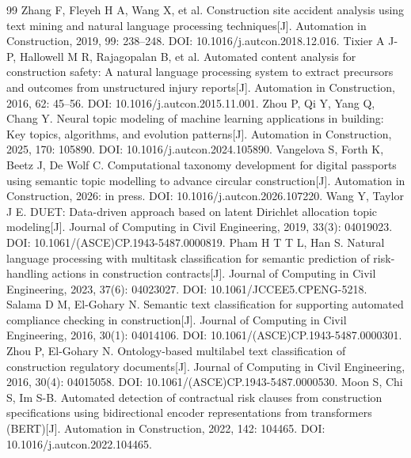 \documentclass[11pt]{article}
\begin{document}
\begin{thebibliography}{99}
 Zhang F, Fleyeh H A, Wang X, et al. Construction site accident analysis using text mining and natural language processing techniques[J]. Automation in Construction, 2019, 99: 238--248. DOI: 10.1016/j.autcon.2018.12.016.
 Tixier A J-P, Hallowell M R, Rajagopalan B, et al. Automated content analysis for construction safety: A natural language processing system to extract precursors and outcomes from unstructured injury reports[J]. Automation in Construction, 2016, 62: 45--56. DOI: 10.1016/j.autcon.2015.11.001.
 Zhou P, Qi Y, Yang Q, Chang Y. Neural topic modeling of machine learning applications in building: Key topics, algorithms, and evolution patterns[J]. Automation in Construction, 2025, 170: 105890. DOI: 10.1016/j.autcon.2024.105890.
 Vangelova S, Forth K, Beetz J, De Wolf C. Computational taxonomy development for digital passports using semantic topic modelling to advance circular construction[J]. Automation in Construction, 2026: in press. DOI: 10.1016/j.autcon.2026.107220.
 Wang Y, Taylor J E. DUET: Data-driven approach based on latent Dirichlet allocation topic modeling[J]. Journal of Computing in Civil Engineering, 2019, 33(3): 04019023. DOI: 10.1061/(ASCE)CP.1943-5487.0000819.
 Pham H T T L, Han S. Natural language processing with multitask classification for semantic prediction of risk-handling actions in construction contracts[J]. Journal of Computing in Civil Engineering, 2023, 37(6): 04023027. DOI: 10.1061/JCCEE5.CPENG-5218.
 Salama D M, El-Gohary N. Semantic text classification for supporting automated compliance checking in construction[J]. Journal of Computing in Civil Engineering, 2016, 30(1): 04014106. DOI: 10.1061/(ASCE)CP.1943-5487.0000301.
 Zhou P, El-Gohary N. Ontology-based multilabel text classification of construction regulatory documents[J]. Journal of Computing in Civil Engineering, 2016, 30(4): 04015058. DOI: 10.1061/(ASCE)CP.1943-5487.0000530.
 Moon S, Chi S, Im S-B. Automated detection of contractual risk clauses from construction specifications using bidirectional encoder representations from transformers (BERT)[J]. Automation in Construction, 2022, 142: 104465. DOI: 10.1016/j.autcon.2022.104465.
\end{thebibliography}
\end{document}
